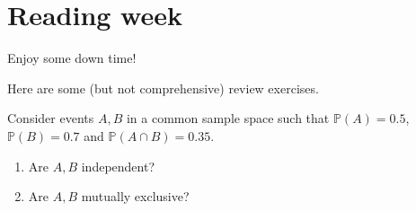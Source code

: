 \documentclass[../main.tex]{subfiles}
\begin{document}
 \section{Reading week}

Enjoy some down time! 

Here are some (but not comprehensive) review exercises.  

\begin{example}
  Consider events \(A,B\) in a common sample space such that \(\mathbb{P}(A) = 0.5\), \(\mathbb{P}(B) = 0.7\) and \(\mathbb{P}(A \cap B) = 0.35\).  

  \begin{enumerate}
    \item Are \(A,B\) independent?
    \item Are \(A,B\) mutually exclusive? 
  \end{enumerate}
\end{example}
\end{document}
